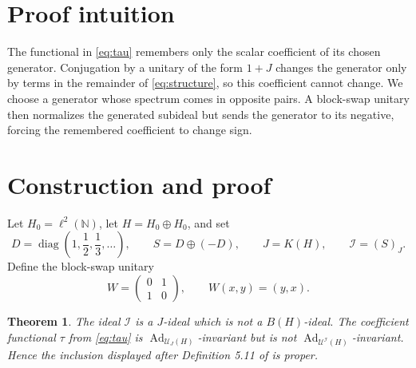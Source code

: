 \documentclass[11pt]{article}
\newtheorem{theorem}{Theorem}
\newcommand{\BH}{B(H)}
\newcommand{\KH}{K(H)}
\newcommand{\cI}{\mathcal I}
\newcommand{\UU}{\mathcal U}
\begin{document}
\section{Proof intuition}

The functional in \eqref{eq:tau} remembers only the scalar coefficient of its
chosen generator.  Conjugation by a unitary of the form $1+J$ changes the
generator only by terms in the remainder of \eqref{eq:structure}, so this
coefficient cannot change.  We choose a generator whose spectrum comes in
opposite pairs.  A block-swap unitary then normalizes the generated subideal
but sends the generator to its negative, forcing the remembered coefficient
to change sign.

\section{Construction and proof}

Let $H_0=\ell^2(\mathbb N)$, let $H=H_0\oplus H_0$, and set
\[
 D=\operatorname{diag}\left(1,\frac12,\frac13,\ldots\right),
 \qquad S=D\oplus(-D),
 \qquad J=\KH,
 \qquad \cI=(S)_J.
\]
Define the block-swap unitary
\[
 W=\begin{pmatrix}0&1\\1&0\end{pmatrix},
 \qquad W(x,y)=(y,x).
\]

\begin{theorem}
The ideal $\cI$ is a $J$-ideal which is not a $\BH$-ideal.  The coefficient
functional $\tau$ from \eqref{eq:tau} is
$\operatorname{Ad}_{\UU_J(H)}$-invariant but is not
$\operatorname{Ad}_{\UU^{\cI}(H)}$-invariant.  Hence the inclusion displayed
after Definition 5.11 of \cite{source} is proper.
\end{theorem}
\end{document}
